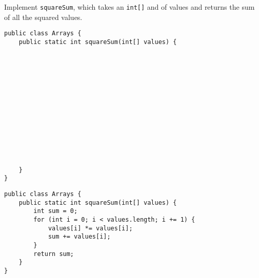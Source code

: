 \begin{blocksection}
\question Implement \lstinline$squareSum$, which takes an \lstinline$int[]$ and
of values and returns the sum of all the squared values.

\ifprintanswers\else
\begin{lstlisting}
public class Arrays {
    public static int squareSum(int[] values) {














    }
}
\end{lstlisting}
\fi

\begin{solution}
\begin{lstlisting}
public class Arrays {
    public static int squareSum(int[] values) {
        int sum = 0;
        for (int i = 0; i < values.length; i += 1) {
            values[i] *= values[i];
            sum += values[i];
        }
        return sum;
    }
}
\end{lstlisting}
\end{solution}
\end{blocksection}
